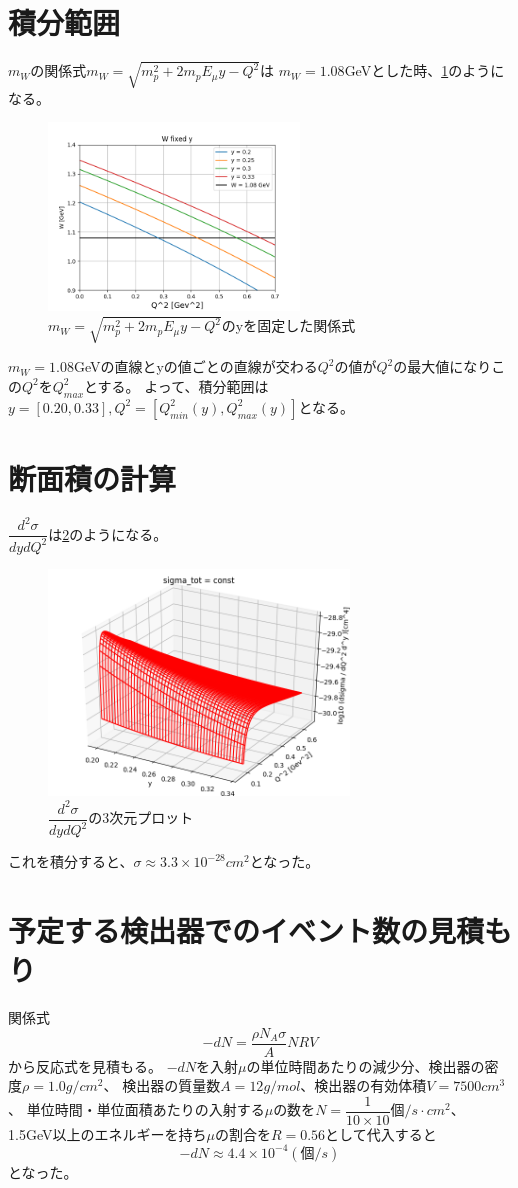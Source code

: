 \section{積分範囲}
$m_W$の関係式$m_W = \sqrt{m_p^2 + 2m_pE_\mu y - Q^2}$は
$m_W = 1.08$GeVとした時、\ref{fig:sigma5}のようになる。
\begin{figure}[H]
    \centering
    \includegraphics[height=5cm]{img/W2_fixed_y.png}
    \caption{$m_W = \sqrt{m_p^2 + 2m_pE_\mu y - Q^2}$のyを固定した関係式}
    \label{fig:sigma5}
\end{figure}
$m_W = 1.08$GeVの直線とyの値ごとの直線が交わる$Q^2$の値が$Q^2$の最大値になりこの$Q^2$を$Q^2_{max}$とする。
よって、積分範囲は$y = [0.20, 0.33], Q^2 = [Q^2_{min}(y), Q^2_{max}(y)]$となる。

\section{断面積の計算}
$\dfrac{d^2\sigma}{dydQ^2}$は\ref{fig:sigma6}のようになる。
\begin{figure}[H]
    \centering
    \includegraphics[width=8cm]{img/integrate_flux_used_artile.png}
    \caption{$\dfrac{d^2\sigma}{dydQ^2}$の3次元プロット}
    \label{fig:sigma6}
\end{figure}
これを積分すると、$\sigma \approx 3.3 \times 10^{-28} cm^2$となった。

\section{予定する検出器でのイベント数の見積もり}
関係式
\begin{equation}
    -dN =\dfrac{\rho N_A \sigma }{A}NRV
\end{equation}
から反応式を見積もる。
$-dN$を入射$\mu$の単位時間あたりの減少分、検出器の密度$\rho = 1.0 g/cm^2$、
検出器の質量数$A = 12 g/mol$、検出器の有効体積$V = 7500cm^3$、
単位時間・単位面積あたりの入射する$\mu$の数を$N = \dfrac{1}{10\times 10} 個/s\cdot cm^2$、
1.5GeV以上のエネルギーを持ち$\mu$の割合を$R = 0.56$として代入すると
\begin{equation}
    -dN \approx 4.4 \times 10^{-4}(個/s)
\end{equation}
となった。